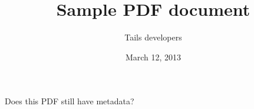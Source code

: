 \documentclass[12pt]{article}
\title{Sample PDF document}
\author{Tails developers}
\date{March 12, 2013}
\begin{document}
\maketitle
Does this PDF still have metadata?
\end{document}
